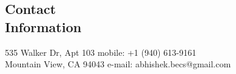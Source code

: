 \documentclass[margin,line]{resume}
\begin{document}
\begin{resume}

%

    \section{\mysidestyle Contact\\Information}

    535 Walker Dr, Apt 103                         \hfill mobile: +1 (940) 613-9161          \vspace{0mm}\\\vspace{0mm}%
    Mountain View, CA 94043      \hfill e-mail: abhishek.becs@gmail.com  \vspace{0mm}\\\vspace{-6mm}%



\end{resume}
\end{document}
